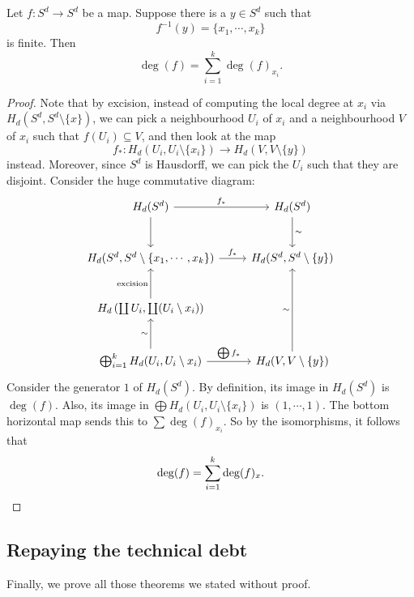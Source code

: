\documentclass[a4paper]{article}
\theoremstyle{definition}
\begin{document}
\begin{thm}
  Let $f: S^d \to S^d$ be a map. Suppose there is a $y \in S^d$ such that
  \[
    f^{-1}(y) = \{x_1, \cdots, x_k\}
  \]
  is finite. Then
  \[
    \deg (f) = \sum_{i = 1}^k \deg(f)_{x_i}.
  \]
\end{thm}

\begin{proof}
  Note that by excision, instead of computing the local degree at $x_i$ via $H_d(S^d, S^d \setminus \{x\})$, we can pick a neighbourhood $U_i$ of $x_i$ and a neighbourhood $V$ of $x_i$ such that $f(U_i) \subseteq V$, and then look at the map
  \[
    f_*: H_d(U_i, U_i \setminus \{x_i\}) \to H_d(V, V \setminus \{y\})
  \]
  instead. Moreover, since $S^d$ is Hausdorff, we can pick the $U_i$ such that they are disjoint. Consider the huge commutative diagram:
  \[
    \begin{tikzcd}[row sep=large]
      H_d(S^d) \ar[r, "f_*"] \ar[d] & H_d(S^d) \ar[d, "\sim"]\\
      H_d(S^d, S^d \setminus \{x_1, \cdots, x_k\}) \ar[r, "f_*"] & H_d(S^d, S^d \setminus \{y\})\\
      H_d\left(\coprod U_i, \coprod (U_i \setminus x_i)\right) \ar[u, "\text{excision}"]\\
      \bigoplus_{i = 1}^ k H_d(U_i, U_i \setminus x_i) \ar[r, "\bigoplus f_*"] \ar[u, "\sim"] & H_d(V, V\setminus \{y\}) \ar[uu, "\sim"]
    \end{tikzcd}
  \]
  Consider the generator $1$ of $H_d(S^d)$. By definition, its image in $H_d(S^d)$ is $\deg(f)$. Also, its image in $\bigoplus H_d(U_i, U_i \setminus \{x_i\})$ is $(1, \cdots, 1)$. The bottom horizontal map sends this to $\sum \deg(f)_{x_i}$. So by the isomorphisms, it follows that
  \[
    \deg(f) = \sum_{i = 1}^k \deg(f)_x.\qedhere
  \]
\end{proof}
\subsection{Repaying the technical debt}
Finally, we prove all those theorems we stated without proof.
\end{document}
